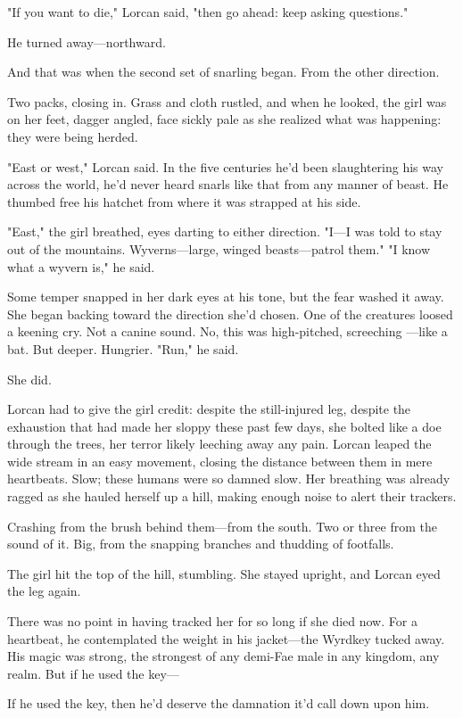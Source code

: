 "If you want to die," Lorcan said, "then go ahead: keep asking questions."

He turned away---northward.

And that was when the second set of snarling began. From the other direction.

Two packs, closing in. Grass and cloth rustled, and when he looked, the girl was on her feet, dagger angled, face sickly pale as she realized what was happening: they were being herded.

"East or west," Lorcan said. In the five centuries he'd been slaughtering his way across the world, he'd never heard snarls like that from any manner of beast. He thumbed free his hatchet from where it was strapped at his side.

"East," the girl breathed, eyes darting to either direction. "I---I was told to stay out of the mountains. Wyverns---large, winged beasts---patrol them." "I know what a wyvern is," he said.

Some temper snapped in her dark eyes at his tone, but the fear washed it away. She began backing toward the direction she'd chosen. One of the creatures loosed a keening cry. Not a canine sound. No, this was high-pitched, screeching ---like a bat. But deeper. Hungrier. "Run," he said.

She did.

Lorcan had to give the girl credit: despite the still-injured leg, despite the exhaustion that had made her sloppy these past few days, she bolted like a doe through the trees, her terror likely leeching away any pain. Lorcan leaped the wide stream in an easy movement, closing the distance between them in mere heartbeats. Slow; these humans were so damned slow. Her breathing was already ragged as she hauled herself up a hill, making enough noise to alert their trackers.

Crashing from the brush behind them---from the south. Two or three from the sound of it. Big, from the snapping branches and thudding of footfalls.

The girl hit the top of the hill, stumbling. She stayed upright, and Lorcan eyed the leg again.

There was no point in having tracked her for so long if she died now. For a heartbeat, he contemplated the weight in his jacket---the Wyrdkey tucked away. His magic was strong, the strongest of any demi-Fae male in any kingdom, any realm. But if he used the key---

If he used the key, then he'd deserve the damnation it'd call down upon him.

